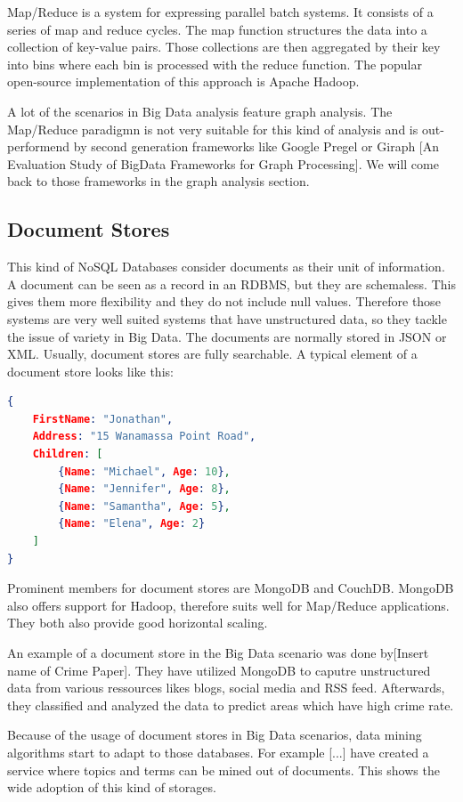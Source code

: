 \documentclass{acm_proc_article-sp}
\begin{document}
Map/Reduce is a system for expressing parallel batch systems. It consists of a series of map and reduce cycles. The map function structures the data into a collection of key-value pairs. Those collections are then aggregated by their key into bins where each bin is processed with the reduce function. The popular open-source implementation of this approach is Apache Hadoop.

A lot of the scenarios in Big Data analysis feature graph analysis. The Map/Reduce paradigmn is not very suitable for this kind of analysis and is out-performend by second generation frameworks like Google Pregel or Giraph [An Evaluation Study of BigData Frameworks for Graph Processing]. We will come back to those frameworks in the graph analysis section.

\subsection{Document Stores}

This kind of NoSQL Databases consider documents as their unit of information. A
document can be seen as a record in an RDBMS, but they are schemaless. This
gives them more flexibility and they do not include null values. Therefore those systems are very well suited systems that have unstructured data, so they tackle the issue of variety in Big Data.
The documents are normally stored in JSON or XML. Usually, document stores are fully searchable. A typical element of a document store looks
like this:

\begin{lstlisting}[language=json,firstnumber=1]
{
	FirstName: "Jonathan",
	Address: "15 Wanamassa Point Road",
	Children: [
		{Name: "Michael", Age: 10},
		{Name: "Jennifer", Age: 8},
		{Name: "Samantha", Age: 5},
		{Name: "Elena", Age: 2}
	]
}
\end{lstlisting}

Prominent members for document stores are MongoDB and CouchDB. MongoDB also offers support for Hadoop, therefore suits well for Map/Reduce applications. They both also provide good horizontal scaling.

An example of a document store in the Big Data scenario was done by[Insert name of Crime Paper]. They have utilized MongoDB to caputre unstructured data from various ressources likes blogs, social media and RSS feed. Afterwards, they classified and analyzed the data to predict areas which have high crime rate.

Because of the usage of document stores in Big Data scenarios, data mining algorithms start to adapt to those databases. For example [...] have created a service where topics and terms can be mined out of documents. This shows the wide adoption of this kind of storages.
\end{document}
